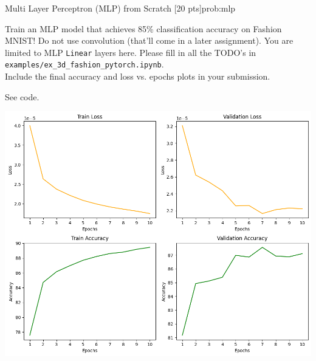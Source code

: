 \begin{problem}{Multi Layer Perceptron (MLP) from Scratch \hfill {[20 pts]}}{prob:mlp}
\begin{adjustwidth}{2em}{2em}
\begin{adjustwidth}{2em}{2em}
        Train an MLP model that achieves 85\% classification accuracy on Fashion MNIST! Do not use convolution (that'll come in a later assignment). You are limited to MLP \verb|Linear| layers here. Please fill in all the TODO's in \verb|examples/ex_3d_fashion_pytorch.ipynb|.\\
        
        Include the final accuracy and loss vs. epochs plots in your submission.
    \end{adjustwidth}    
    
\end{adjustwidth}

\end{problem}

\begin{solution*}{}{}
    See code.

    \begin{center}
        \includegraphics[width=\textwidth]{media/3.png}
    \end{center}
\end{solution*}
